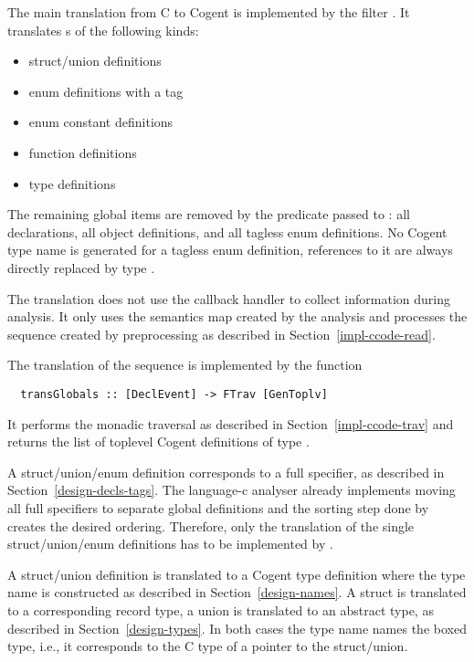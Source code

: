 The main translation from C to Cogent is implemented by the filter . It translates s
of the following kinds:
\begin{itemize}
\item struct/union definitions
\item enum definitions with a tag
\item enum constant definitions
\item function definitions
\item type definitions
\end{itemize}
The remaining global items are removed by the predicate passed to : all declarations, 
all object definitions, and all tagless enum definitions. No Cogent type name is generated for a tagless enum definition,
references to it are always directly replaced by type .

The translation does not use the callback handler to collect information during analysis. It only uses the semantics map
created by the analysis and processes the  sequence created by preprocessing as described in 
Section~\ref{impl-ccode-read}.

The translation of the  sequence is implemented by the function
\begin{verbatim}
  transGlobals :: [DeclEvent] -> FTrav [GenToplv]
\end{verbatim}
It performs the monadic traversal as described in Section~\ref{impl-ccode-trav} and returns the list of toplevel
Cogent definitions of type .

A struct/union/enum definition corresponds to a full specifier, as described in Section~\ref{design-decls-tags}.
The language-c analyser already implements moving all full specifiers to separate global definitions and the
sorting step done by  creates the desired ordering. Therefore, only the translation
of the single struct/union/enum definitions has to be implemented by .

A struct/union definition is translated to a Cogent type definition where the type name is constructed as described 
in Section~\ref{design-names}. A struct is translated to a corresponding record type, a union is translated to an 
abstract type, as described in Section~\ref{design-types}.
In both cases the type name names the boxed type, i.e., it corresponds to the C type of a pointer to the struct/union.

